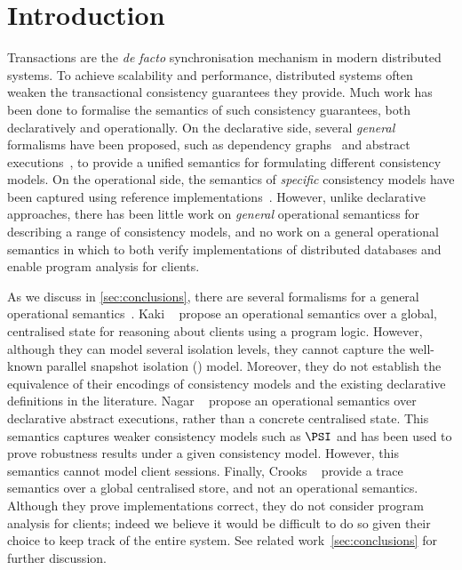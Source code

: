 \section{Introduction}
Transactions are the \emph{de facto} synchronisation mechanism in modern distributed systems.
To achieve scalability and performance, distributed systems often weaken the transactional consistency guarantees they provide. 
%
%
Much work has been done to formalise the semantics of such consistency guarantees, both
declaratively and operationally.
On the declarative side, several \emph{general} formalisms have been proposed, 
such as dependency graphs~\cite{adya} and abstract executions~\cite{framework-concur}, to provide a unified
semantics for formulating different consistency models.  
On the operational side, the semantics of \emph{specific} consistency models have
been captured using reference implementations~\cite{si,PSI,PSI-RA}. 
However, unlike declarative approaches, there has been
little work on \emph{general} operational semanticss for describing a range
of consistency models, and no work on a general operational semantics
in which to both verify implementations of distributed databases and 
enable program analysis for clients.

As we discuss in \cref{sec:conclusions}, there are several formalisms for a general operational semantics~\cite{sureshConcur,alonetogether,seebelieve}. 
Kaki \etal~\cite{alonetogether} propose an operational semantics over a global, centralised state for reasoning about clients using a program logic. 
However, although they can model several isolation levels, they cannot capture the well-known
parallel snapshot isolation (\PSI) model. 
Moreover, they do not establish the equivalence of their encodings of consistency models 
and the existing declarative definitions in the literature. 
Nagar \etal~\cite{sureshConcur} propose an operational semantics over declarative abstract executions, rather than a concrete centralised state. This semantics captures weaker consistency models
such as \(\PSI\) and has been used to prove robustness results under a given consistency model.  
However, this semantics cannot model client sessions.
Finally, Crooks \etal~\cite{seebelieve} provide a trace semantics over a global
centralised store, and not an operational semantics. 
Although they prove implementations correct, they do not consider program analysis for clients;
indeed we believe it would be difficult to do so given their choice to
keep track of the entire system.
See related work~\cref{sec:conclusions} for further discussion. 




